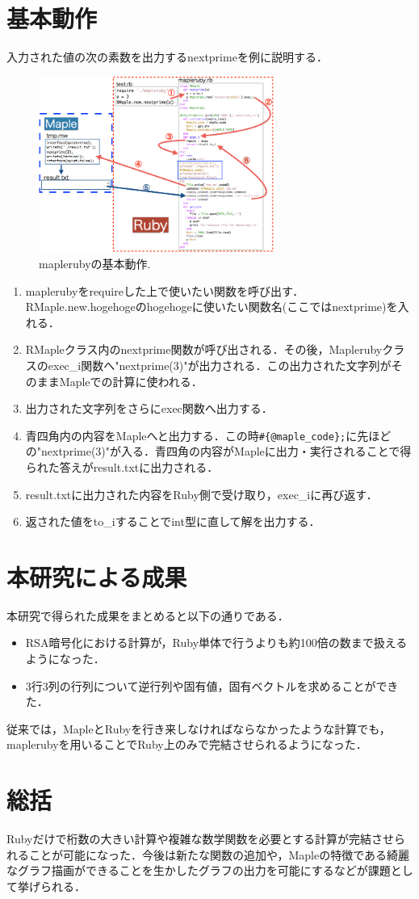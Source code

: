 \documentclass[10pt,a4j,twocolumn]{jsarticle}
\begin{document}
\section{基本動作}
\vspace{-0.5em}
入力された値の次の素数を出力するnextprimeを例に説明する．
\begin{figure}[htbp]\begin{center}
\includegraphics[width=7.7cm, bb=0 0 546 408]{./mapleruby_003.png}
\caption{maplerubyの基本動作.}
\label{default}\end{center}
\vspace{-2em}
\end{figure}
\begin{enumerate}
\item maplerubyをrequireした上で使いたい関数を呼び出す．RMaple.new.hogehogeのhogehogeに使いたい関数名(ここではnextprime)を入れる．
\item RMapleクラス内のnextprime関数が呼び出される．その後，Maplerubyクラスのexec\_i関数へ"nextprime(3)"が出力される．この出力された文字列がそのままMapleでの計算に使われる．
\item 出力された文字列をさらにexec関数へ出力する．
\item 青四角内の内容をMapleへと出力する．この時\verb|#{@maple_code};|に先ほどの"nextprime(3)"が入る．青四角の内容がMapleに出力・実行されることで得られた答えがresult.txtに出力される．
\item result.txtに出力された内容をRuby側で受け取り，exec\_iに再び返す．
\item 返された値をto\_iすることでint型に直して解を出力する．
\end{enumerate}


\section{本研究による成果}
\vspace{-0.5em}
本研究で得られた成果をまとめると以下の通りである．
\begin{itemize}
\item RSA暗号化における計算が，Ruby単体で行うよりも約100倍の数まで扱えるようになった．
\item 3行3列の行列について逆行列や固有値，固有ベクトルを求めることができた．
\end{itemize}
従来では，MapleとRubyを行き来しなければならなかったような計算でも，maplerubyを用いることでRuby上のみで完結させられるようになった．

\section{総括}
\vspace{-0.5em}
Rubyだけで桁数の大きい計算や複雑な数学関数を必要とする計算が完結させられることが可能になった．今後は新たな関数の追加や，Mapleの特徴である綺麗なグラフ描画ができることを生かしたグラフの出力を可能にするなどが課題として挙げられる．
\end{document}
